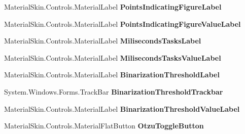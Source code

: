 \begin{DoxyCompactItemize}
Material\+Skin.\+Controls.\+Material\+Label {\bfseries Points\+Indicating\+Figure\+Label}
\item 
\mbox{\label{class_chess_tracking_1_1_user_interface_1_1_advanced_settings_form_a1cfe8b274d319696d25e4d0ffd3ff315}} 
Material\+Skin.\+Controls.\+Material\+Label {\bfseries Points\+Indicating\+Figure\+Value\+Label}
\item 
\mbox{\label{class_chess_tracking_1_1_user_interface_1_1_advanced_settings_form_a907919331b6fbe9f3f7e5868d4bdaef7}} 
Material\+Skin.\+Controls.\+Material\+Label {\bfseries Miliseconds\+Tasks\+Label}
\item 
\mbox{\label{class_chess_tracking_1_1_user_interface_1_1_advanced_settings_form_aec760f185fa80e8a16a2ce5df43acd05}} 
Material\+Skin.\+Controls.\+Material\+Label {\bfseries Miliseconds\+Tasks\+Value\+Label}
\item 
\mbox{\label{class_chess_tracking_1_1_user_interface_1_1_advanced_settings_form_af824b4c34823de7f5cddcbf9492241cd}} 
Material\+Skin.\+Controls.\+Material\+Label {\bfseries Binarization\+Threshold\+Label}
\item 
\mbox{\label{class_chess_tracking_1_1_user_interface_1_1_advanced_settings_form_a01a8e64346606510f150157beac80273}} 
System.\+Windows.\+Forms.\+Track\+Bar {\bfseries Binarization\+Threshold\+Trackbar}
\item 
\mbox{\label{class_chess_tracking_1_1_user_interface_1_1_advanced_settings_form_af1196c6e03d1f685178d06c3f185b39a}} 
Material\+Skin.\+Controls.\+Material\+Label {\bfseries Binarization\+Threshold\+Value\+Label}
\item 
\mbox{\label{class_chess_tracking_1_1_user_interface_1_1_advanced_settings_form_ae16b8ce7caa95de959f051b3fa25873e}} 
Material\+Skin.\+Controls.\+Material\+Flat\+Button {\bfseries Otzu\+Toggle\+Button}

\end{DoxyCompactItemize}
